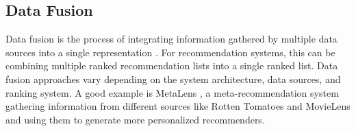 \subsection{Data Fusion}
Data fusion is the process of integrating information gathered by multiple data sources into a single representation \cite{hsu2005comparing}. For recommendation systems, this can be combining multiple ranked recommendation lists into a single ranked list. Data fusion approaches vary depending on the system architecture, data sources, and ranking system. A good example is MetaLens \cite{schafer2002meta}, a meta-recommendation system gathering information from different sources like Rotten Tomatoes and MovieLens and using them to generate more personalized recommenders.
 \cite{wu2006performance}

